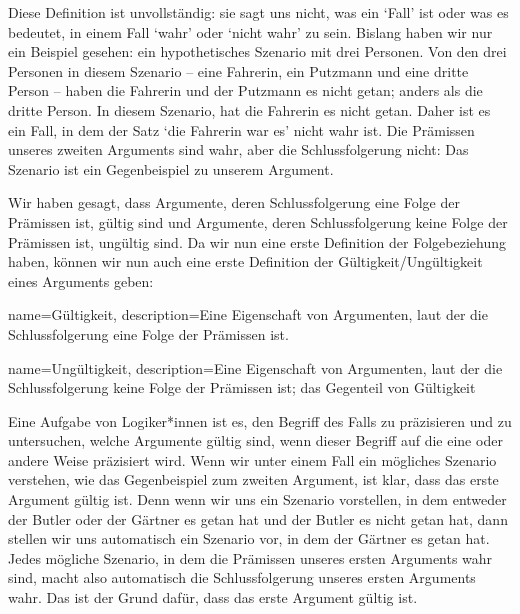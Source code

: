 
Diese Definition ist unvollständig: sie sagt uns nicht, was ein `Fall' ist oder was es bedeutet, in einem Fall `wahr' oder `nicht wahr' zu sein. Bislang haben wir nur ein Beispiel gesehen: ein hypothetisches Szenario mit drei Personen. Von den drei Personen in diesem Szenario -- eine Fahrerin, ein Putzmann und eine dritte Person -- haben die Fahrerin und der Putzmann es nicht getan; anders als die dritte Person. In diesem Szenario, hat die Fahrerin es nicht getan. Daher ist es ein Fall, in dem der Satz `die Fahrerin war es' nicht wahr ist. Die Prämissen unseres zweiten Arguments sind wahr, aber die Schlussfolgerung nicht: Das Szenario ist ein Gegenbeispiel zu unserem Argument.

Wir haben gesagt, dass Argumente, deren Schlussfolgerung eine Folge der Prämissen ist, gültig sind und Argumente, deren Schlussfolgerung keine Folge der Prämissen ist, ungültig sind. Da wir nun eine erste Definition der Folgebeziehung haben, können wir nun auch eine erste Definition der Gültigkeit/Ungültigkeit eines Arguments geben: 



{
name=Gültigkeit,
description={Eine Eigenschaft von Argumenten, laut der die Schlussfolgerung eine Folge der Prämissen ist.}
}

{
name=Ungültigkeit,
description={Eine Eigenschaft von Argumenten, laut der die Schlussfolgerung keine Folge der Prämissen ist; das Gegenteil von \gls{Gültigkeit}}
}

Eine Aufgabe von Logiker*innen ist es, den Begriff des Falls zu präzisieren und zu untersuchen, welche Argumente gültig sind, wenn dieser Begriff auf die eine oder andere Weise präzisiert wird. Wenn wir unter einem Fall ein mögliches Szenario verstehen, wie das Gegenbeispiel zum zweiten Argument, ist klar, dass das erste Argument gültig ist. Denn wenn wir uns ein Szenario vorstellen, in dem entweder der Butler oder der Gärtner es getan hat und der Butler es nicht getan hat, dann stellen wir uns automatisch ein Szenario vor, in dem der Gärtner es getan hat. Jedes mögliche Szenario, in dem die Prämissen unseres ersten Arguments wahr sind, macht also automatisch die Schlussfolgerung unseres ersten Arguments wahr. Das ist der Grund dafür, dass das erste Argument gültig ist. 

